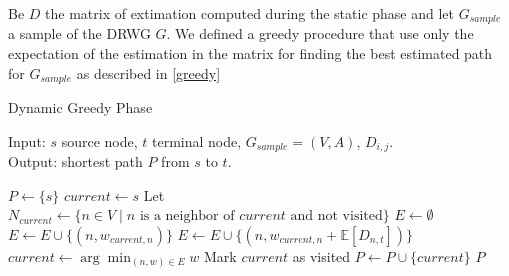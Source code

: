 Be $D$ the matrix of extimation computed during the static phase and let $G_{sample}$ a sample of the DRWG $G$. We defined a greedy procedure that use only the expectation of the estimation in the matrix for finding the best estimated path for $G_{sample}$ as described in \ref{greedy} 


\begin{algorithm}\label{greedy}
	\caption{Dynamic Greedy Phase} 
    Input: $s$ source node, $t$ terminal node, $G_{sample} = (V,A)$, $D_{i,j}$.  \\
    Output: shortest path $P$ from $s$ to $t$.
	\begin{algorithmic}
        \State $P \gets \{s\}$
        \State $current \gets s$
            \State Let $N_{current} \gets \{n \in V \mid n \text{ is a neighbor of } current \text{ and not visited}\}$
            \State $E \gets \emptyset$
                    \State $E \gets E \cup \{(n, w_{current,n})\}$
                \Else
                    \State $E \gets E \cup \{(n, w_{current,n} + \mathbb{E}[D_{n,t}])\}$
                \EndIf
            \EndFor
            \State $current \gets \arg\min_{(n,w) \in E} w$
            \State Mark $current$ as visited
            \State $P \gets P \cup \{current\}$
        \EndWhile
        \State \Return $P$
	\end{algorithmic} 
\end{algorithm}
